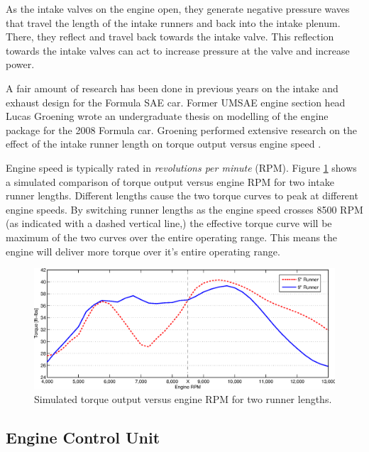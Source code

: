 As the intake valves on the engine open, they generate negative pressure waves that travel the length of the intake runners and back into the intake plenum. There, they reflect and travel back towards the intake valve. This reflection towards the intake valves can act to increase pressure at the valve and increase power.


A fair amount of research has been done in previous years on the intake and exhaust design for the Formula SAE car. Former UMSAE engine section head Lucas Groening wrote an undergraduate thesis on modelling of the engine package for the 2008 Formula car. Groening performed extensive research on the effect of the intake runner length on torque output versus engine speed \cite{LucasIntake}. 

Engine speed is typically rated in \emph{revolutions per minute} (RPM). Figure \ref{fig:irl_effect} shows a simulated comparison of torque output versus engine RPM for two intake runner lengths. Different lengths cause the two torque curves to peak at different engine speeds. By switching runner lengths as the engine speed crosses 8500 RPM (as indicated with a dashed vertical line,) the effective torque curve will be maximum of the two curves over the entire operating range. This means the engine will deliver more torque over it's entire operating range.

\begin{figure}[H]
\centering
\includegraphics[width=6in,keepaspectratio]{background/figures/irl_effect2.eps}
\caption{Simulated torque output versus engine RPM for two runner lengths.}
\label{fig:irl_effect}
\end{figure}

\subsection{Engine Control Unit}
\label{sec:ECU}

